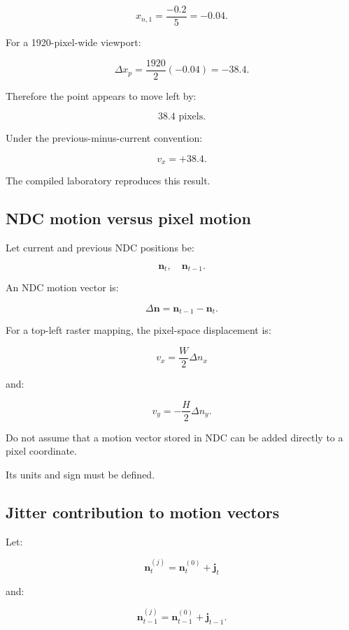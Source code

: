 \[
 x_{n,1}=\frac{-0.2}{5}=-0.04.
\]

For a 1920-pixel-wide viewport:

\[
 \Delta x_p=\frac{1920}{2}(-0.04) =-38.4.
\]

Therefore the point appears to move left by:

\[
 \boxed{38.4\text{ pixels}}.
\]

Under the previous-minus-current convention:

\[
 v_x=+38.4.
\]

The compiled laboratory reproduces this result.

\subsection{NDC motion versus pixel motion}\label{02-foundations-ii-ch036-ndc-motion-versus-pixel-motion}

\hypertarget{02-foundations-ii-ch036-ndc-motion-versus-pixel-motion}{}

Let current and previous NDC positions be:

\[
 \mathbf n_t,\quad\mathbf n_{t-1}.
\]

An NDC motion vector is:

\[
 \Delta\mathbf n=\mathbf n_{t-1}-\mathbf n_t.
\]

For a top-left raster mapping, the pixel-space displacement is:

\[
 \boxed{ v_x=\frac W2\Delta n_x }
\]

and:

\[
 \boxed{ v_y=-\frac H2\Delta n_y }.
\]

Do not assume that a motion vector stored in NDC can be added directly to a pixel coordinate.

Its units and sign must be defined.

\subsection{Jitter contribution to motion vectors}\label{02-foundations-ii-ch036-jitter-contribution-to-motion-vectors}

\hypertarget{02-foundations-ii-ch036-jitter-contribution-to-motion-vectors}{}

Let:

\[
 \mathbf n_t^{(j)}= \mathbf n_t^{(0)}+\mathbf j_t
\]

and:

\[
 \mathbf n_{t-1}^{(j)}= \mathbf n_{t-1}^{(0)}+\mathbf j_{t-1}.
\]

